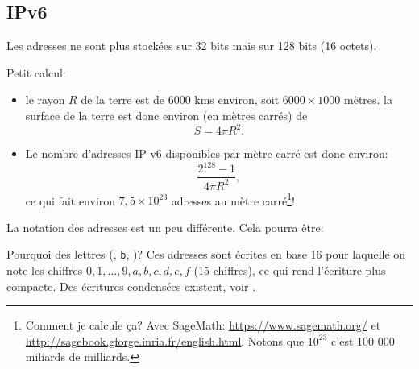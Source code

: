 \subsection{IPv6}
  Les adresses ne sont plus stockées sur 32 bits mais sur 128 bits (16
  octets).

  Petit calcul:

  \begin{itemize}
    \item le rayon $R$ de la terre est de 6000 kms environ, soit $6000
      \times 1000$ mètres. la surface de la terre est  donc environ (en
      mètres carrés) de
      $$S= 4 \pi R^2.$$
    \item Le nombre d'adresses IP v6 disponibles par mètre carré est
      donc environ:
      $$\frac{2^{128}-1 }{4 \pi R^2},$$
      ce qui fait environ $7,5\times  10^{23}$ adresses au mètre
          carré\footnote{Comment je calcule ça? Avec SageMath:
            \url{https://www.sagemath.org/} et
            \url{http://sagebook.gforge.inria.fr/english.html}.
          Notons que $10^{23}$ c'est 100 000 miliards de milliards.}!
  \end{itemize}

  La notation des adresses est un peu différente. Cela pourra être:

  \begin{center}
  \end{center}
  
  Pourquoi des lettres (, \texttt{b}, )? Ces  adresses
  sont écrites 
  en base 16 pour laquelle on note les chiffres
  $0,1,\ldots,9,a,b,c,d,e,f$ (15 chiffres), ce qui rend l'écriture plus
  compacte. Des écritures condensées existent, voir \cite{v6}.

